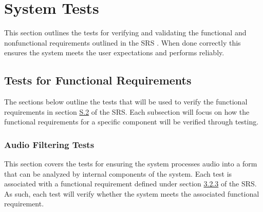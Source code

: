 \documentclass[12pt, titlepage]{article}
\begin{document}


\section{System Tests}

This section outlines the tests for verifying and validating the functional and 
nonfunctional requirements outlined in the SRS \citep{SRS}. When done correctly 
this ensures the system meets the user expectations and performs reliably. 

\subsection{Tests for Functional Requirements}

The sections below outline the tests that will be used to verify the functional 
requirements in section \hyperref[SRS-sec:S.2]{S.2} of the SRS. Each subsection 
will focus on how the functional requirements for a specific component will be 
verified through testing. 

\subsubsection{Audio Filtering Tests}

This section covers the tests for ensuring the system processes audio into a 
form that can be analyzed by internal components of the system. Each test is 
associated with a functional requirement defined under section 
\hyperref[SRS-sec:FR3]{3.2.3} of the SRS. As such, each test will verify whether
 the system meets the associated functional requirement. 
\end{document}
